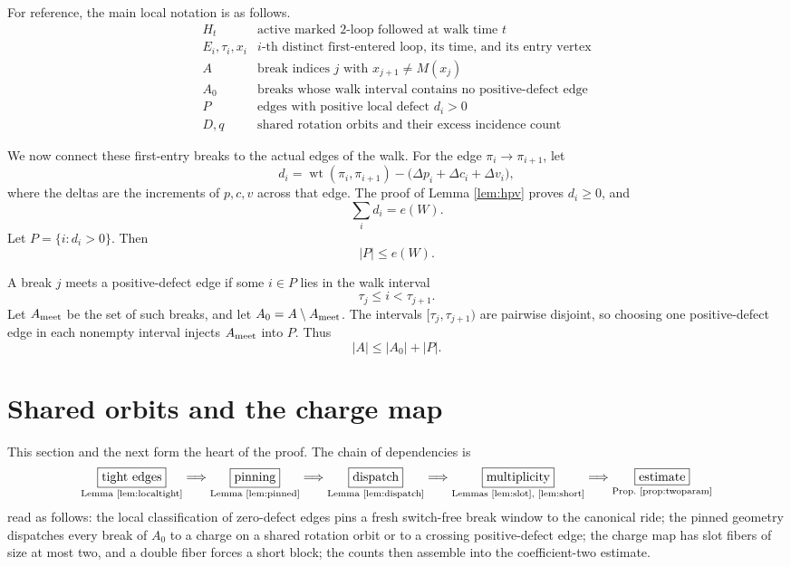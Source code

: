 \documentclass[11pt]{article}
\DeclareMathOperator{\wt}{wt}
\begin{document}
For reference, the main local notation is as follows.
\[
\begin{array}{c|l}
H_t & \text{active marked \(2\)-loop followed at walk time \(t\)}\\
E_i,\tau_i,x_i & \text{\(i\)-th distinct first-entered loop, its time, and its entry vertex}\\
A & \text{break indices \(j\) with \(x_{j+1}\ne M(x_j)\)}\\
A_0 & \text{breaks whose walk interval contains no positive-defect edge}\\
P & \text{edges with positive local defect \(d_i>0\)}\\
D,q & \text{shared rotation orbits and their excess incidence count}
\end{array}
\]

We now connect these first-entry breaks to the actual edges of the walk.  For the edge
\(\pi_i\to\pi_{i+1}\), let
\[
  d_i=\wt(\pi_i,\pi_{i+1})
       -\bigl(\Delta p_i+\Delta c_i+\Delta v_i\bigr),
\]
where the deltas are the increments of \(p,c,v\) across that edge.  The proof of Lemma
\ref{lem:hpv} proves \(d_i\ge 0\), and
\[
  \sum_i d_i=e(W).
\]
Let \(P=\{i:d_i>0\}\).  Then
\[
  |P|\le e(W). \tag{4}
\]

A break \(j\) meets a positive-defect edge if some \(i\in P\) lies in the walk interval
\[
  \tau_j\le i<\tau_{j+1}.
\]
Let \(A_{\rm meet}\) be the set of such breaks, and let \(A_0=A\setminus A_{\rm meet}\).  The
intervals \([\tau_j,\tau_{j+1})\) are pairwise disjoint, so choosing one positive-defect edge in
each nonempty interval injects \(A_{\rm meet}\) into \(P\).  Thus
\[
  |A|\le |A_0|+|P|. \tag{5}
\]

\section{Shared orbits and the charge map}

This section and the next form the heart of the proof.  The chain of dependencies is
\[
  \underset{\text{Lemma \ref{lem:localtight}}}{\boxed{\text{tight edges}}}
  \Longrightarrow
  \underset{\text{Lemma \ref{lem:pinned}}}{\boxed{\text{pinning}}}
  \Longrightarrow
  \underset{\text{Lemma \ref{lem:dispatch}}}{\boxed{\text{dispatch}}}
  \Longrightarrow
  \underset{\text{Lemmas \ref{lem:slot}, \ref{lem:short}}}{\boxed{\text{multiplicity}}}
  \Longrightarrow
  \underset{\text{Prop.\ \ref{prop:twoparam}}}{\boxed{\text{estimate}}}
\]
read as follows: the local classification of zero-defect edges pins a fresh switch-free
break window to the canonical ride; the pinned geometry dispatches every break of \(A_0\)
to a charge on a shared rotation orbit or to a crossing positive-defect edge; the charge
map has slot fibers of size at most two, and a double fiber forces a short block; the
counts then assemble into the coefficient-two estimate.
\end{document}
